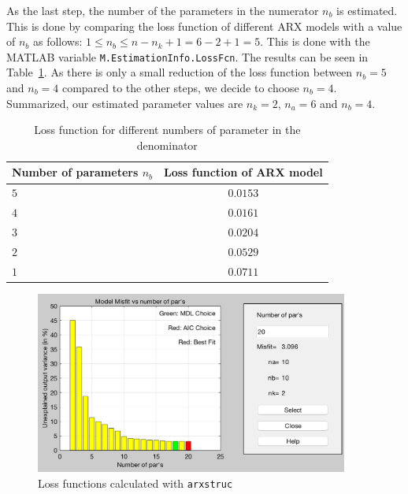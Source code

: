 As the last step, the number of the parameters in the numerator $n_b$ is estimated. This is done by comparing the loss function of different ARX models with a value of $n_b$ as follows: $1 \leq n_b \leq n  - n_k + 1 = 6 - 2 + 1 = 5$. This is done with the MATLAB variable \texttt{M.EstimationInfo.LossFcn}. The results can be seen in Table~\ref{tab:denom}.
As there is only a small reduction of the loss function between $n_b = 5$ and $n_b = 4$ compared to the other steps, we decide to choose $n_b = 4$. \\
Summarized, our estimated parameter values are $n_k = 2$, $n_a = 6$ and  $n_b = 4$.


\begin{table}[h]
	\centering
	\begin{tabular}{l|c}
	\hline
	\hline
	\textbf{Number of parameters $n_b$} & \textbf{Loss function of ARX model}\\
	\hline
		$5$ & $0.0153$ \\ \hline
		$4$ & $0.0161$ \\ \hline
		$3$ & $0.0204$ \\ \hline
		$2$ & $0.0529$ \\ \hline
		$1$ & $0.0711$ \\ \hline
	\hline
	\end{tabular}
	\caption{Loss function for different numbers of parameter in the denominator}
	\label{tab:denom}
\end{table}

\begin{figure}[h]
	\centering
	\includegraphics[height=6cm]{figures/selstruc.png}
	\caption{Loss functions calculated with \texttt{arxstruc}}\label{fig:selstruc}
\end{figure}

